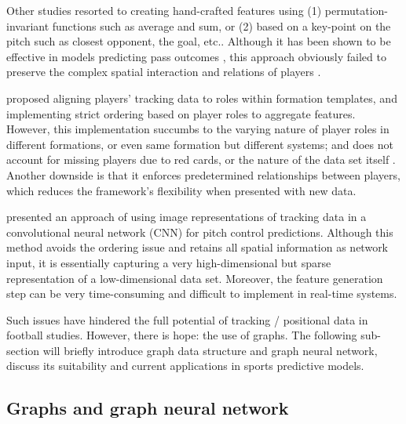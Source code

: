 \documentclass[conference]{IEEEtran}
\begin{document}
Other studies resorted to creating hand-crafted features using (1) permutation-invariant functions such as average and sum, or (2) based on a key-point on the pitch such as closest opponent, the goal, etc.. Although it has been shown to be effective in models predicting pass outcomes \parencite{riskrewardpower, goesriskreward, xPass2022}, this approach obviously failed to preserve the complex spatial interaction and relations of players \parencite{gnn_overall, gnn_framework}.

\textcite{wei2013large} proposed aligning players' tracking data to roles within formation templates, and implementing strict ordering based on player roles to aggregate features. However, this implementation succumbs to the varying nature of player roles in different formations, or even same formation but different systems; and does not account for missing players due to red cards, or the nature of the data set itself \parencite{GNNPaulPower}. Another downside is that it enforces predetermined relationships between players, which reduces the framework's flexibility when presented with new data.

\textcite{soccermap, Brefeld} presented an approach of using image representations of tracking data in a convolutional neural network (CNN) for pitch control predictions. Although this method avoids the ordering issue and retains all spatial information as network input, it is essentially capturing a very high-dimensional but sparse representation of a low-dimensional data set. Moreover, the feature generation step can be very time-consuming \parencite{GNNPaulPower} and difficult to implement in real-time systems. 

Such issues have hindered the full potential of tracking / positional data in football studies. However, there is hope: the use of graphs. The following sub-section will briefly introduce graph data structure and graph neural network, discuss its suitability and current applications in sports predictive models.







\subsection{Graphs and graph neural network}\label{graphlit}
\end{document}
